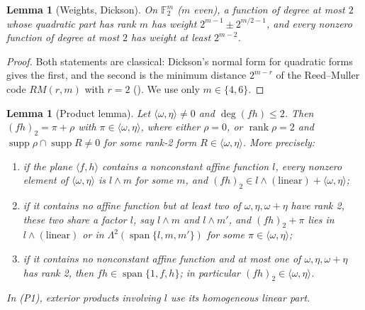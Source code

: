 \documentclass[11pt,a4paper]{article}
\theoremstyle{plain}
\newtheorem{lemma}[theorem]{Lemma}
\theoremstyle{remark}
\newcommand{\F}{\mathbb F_2}
\newcommand{\Span}{\operatorname{span}}
\newcommand{\supp}{\operatorname{supp}}
\newcommand{\rk}{\operatorname{rank}}
\newcommand{\Lam}{\Lambda^2}
\begin{document}
\begin{lemma}[Weights, Dickson]\label{l3:lem:wt}
On $\F^m$ ($m$ even), a function of degree at most $2$ whose quadratic part has rank $m$ has weight $2^{m-1}\pm2^{m/2-1}$, and every nonzero function of degree at most $2$ has weight at least $2^{m-2}$.
\end{lemma}

\begin{proof}
Both statements are classical: Dickson's normal form for quadratic forms gives the first, and the second is the minimum distance $2^{m-r}$ of the Reed--Muller code $RM(r,m)$ with $r=2$ (\cite[Ch.~13 and~15]{MS}). We use only $m\in\{4,6\}$.
\end{proof}

\begin{lemma}[Product lemma]\label{l3:lem:P}
Let $\langle\omega,\eta\rangle\neq0$ and $\deg(fh)\le 2$. Then $(fh)_2=\pi+\rho$ with $\pi\in\langle\omega,\eta\rangle$, where either $\rho=0$, or $\rk\rho=2$ and $\supp\rho\cap\supp R\neq0$ for some rank-2 form $R\in\langle\omega,\eta\rangle$. More precisely:
\begin{enumerate}[(P1)]
\item if the plane $\langle f,h\rangle$ contains a nonconstant affine function $l$, every nonzero element of $\langle\omega,\eta\rangle$ is $l\wedge m$ for some $m$, and $(fh)_2\in l\wedge(\text{linear})+\langle\omega,\eta\rangle$;
\item if it contains no affine function but at least two of $\omega,\eta,\omega+\eta$ have rank 2, these two share a factor $l$, say $l\wedge m$ and $l\wedge m'$, and $(fh)_2+\pi$ lies in $l\wedge(\text{linear})$ or in $\Lam(\Span\{l,m,m'\})$ for some $\pi\in\langle\omega,\eta\rangle$;
\item if it contains no nonconstant affine function and at most one of $\omega,\eta,\omega+\eta$ has rank 2, then $fh\in\Span\{1,f,h\}$; in particular $(fh)_2\in\langle\omega,\eta\rangle$.
\end{enumerate}
In (P1), exterior products involving $l$ use its homogeneous linear part.
\end{lemma}
\end{document}
